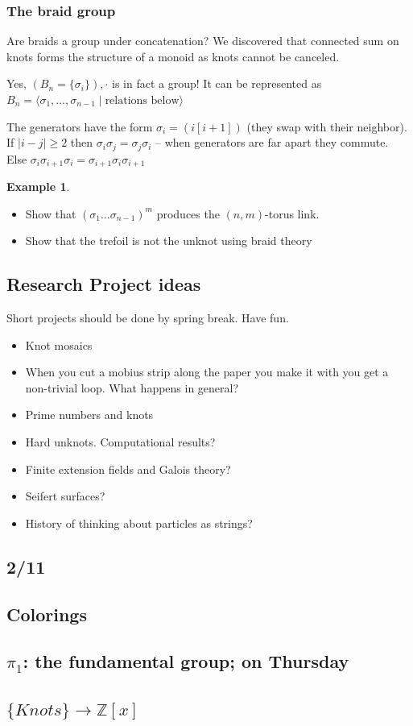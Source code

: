 \documentclass[11pt]{article}
\newcommand{\set}[1]{\{ #1 \}}
\newcommand{\abs}[1]{\left| #1 \right|}
\theoremstyle{plain}
\theoremstyle{definition}
\newtheorem{ex}{Example}
\begin{document}
\subsubsection{The braid group}

Are braids a group under concatenation? We discovered that connected sum on knots forms the structure of a monoid as knots cannot be canceled.

Yes, $(B_n = \set{\sigma_i}), \cdot$ is in fact a group! It can be represented as $B_n = \langle\sigma_1, \ldots, \sigma_{n-1}\; |\; \text{relations below}\rangle$

The generators have the form $\sigma_i = (i [i + 1])$ (they swap with their neighbor). If $\abs{i - j} \geq 2$ then $\sigma_i \sigma_j = \sigma_j \sigma_i$ -- when generators are far apart they commute.
Else $\sigma_i \sigma_{i +1} \sigma_i = \sigma_{i + 1} \sigma_i \sigma_{i + 1}$


\begin{ex}

  \begin{itemize}
    \item Show that $(\sigma_1 \dots \sigma_{n - 1})^m$ produces the $(n, m)$-torus link.
    \item Show that the trefoil is not the unknot using braid theory
  \end{itemize}

\end{ex}


\subsection{Research Project ideas}

Short projects should be done by spring break. Have fun.

\begin{itemize}
  \item Knot mosaics
  \item When you cut a mobius strip along the paper you make it with you get a non-trivial loop. What happens in general?
  \item Prime numbers and knots
  \item Hard unknots. Computational results?
  \item Finite extension fields and Galois theory?
  \item Seifert surfaces?
  \item History of thinking about particles as strings?
\end{itemize}



\subsection{2/11}

\subsection{Colorings}




\subsection{$\pi_1$: the fundamental group; on Thursday}



\subsection{$\lbrace Knots\rbrace\to\mathbb{Z}[x]$}
\end{document}
